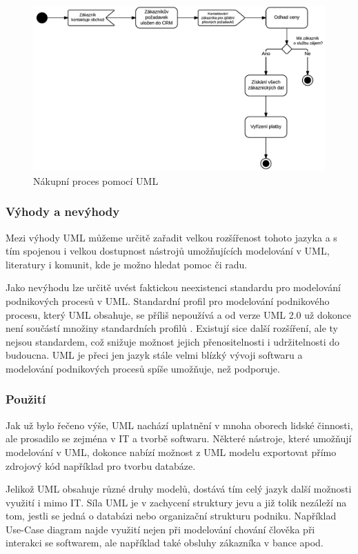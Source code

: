 \begin{figure}[H]\centering
\includegraphics[width=1.0\textwidth]{obrazky/uml_nakupniproces}
\caption{Nákupní proces pomocí UML}
\label{fig:UML_nakupniproces}
\end{figure}

\subsubsection{Výhody a nevýhody}
Mezi výhody UML můžeme určitě zařadit velkou rozšířenost tohoto jazyka a s tím spojenou i velkou dostupnost nástrojů umožňujících  modelování v UML, literatury i komunit, kde je možno hledat pomoc či radu.

Jako nevýhodu lze určitě uvést faktickou neexistenci standardu pro modelování podnikových procesů v UML. Standardní profil pro modelování podnikového procesu, který UML obsahuje, se příliš nepoužívá a od verze UML 2.0 už dokonce není součástí množiny standardních profilů \cite{Repa2007}. Existují sice další rozšíření, ale ty nejsou standardem, což snižuje možnost jejich přenositelnosti i udržitelnosti do budoucna. UML je přeci jen jazyk stále velmi blízký vývoji softwaru a modelování podnikových procesů spíše umožňuje, než podporuje.

\subsubsection{Použití}
Jak už bylo řečeno výše, UML nachází uplatnění v mnoha oborech lidské činnosti, ale prosadilo se zejména v IT a tvorbě softwaru. Některé nástroje, které umožňují modelování v UML, dokonce nabízí možnost z UML modelu exportovat přímo zdrojový kód například pro tvorbu databáze.

Jelikož UML obsahuje různé druhy modelů, dostává tím celý jazyk další možnosti využití i mimo IT. Síla UML je v zachycení struktury jevu a již tolik nezáleží na tom, jestli se jedná o databázi nebo organizační strukturu podniku. Například Use-Case diagram najde využití nejen při modelování chování člověka při interakci se softwarem, ale například také obsluhy zákazníka v bance apod. 

